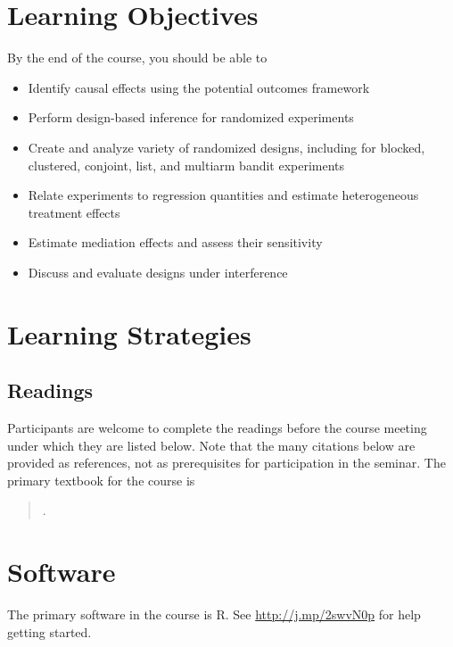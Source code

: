 \documentclass[11pt]{article}
\newcommand{\bibverse}[1]{\begin{verse} \bibentry{#1}. \end{verse}}
\begin{document}
\section*{Learning Objectives}

By the end of the course, you should be able to

\begin{itemize}
\item Identify causal effects using the potential outcomes framework
\item Perform design-based inference for randomized experiments
\item Create and analyze variety of randomized designs, including for blocked, clustered, conjoint, list, and multiarm bandit experiments
\item Relate experiments to regression quantities and estimate heterogeneous treatment effects
\item Estimate mediation effects and assess their sensitivity
\item Discuss and evaluate designs under interference
\end{itemize}

\section*{Learning Strategies}

\subsection*{Readings}

Participants are welcome to complete the readings before the course meeting under which they are listed below. Note that the many citations below are provided as references, not as prerequisites for participation in the seminar. The primary textbook for the course is

\nobibliography*

\bibverse{gergre12}

\section*{Software}

The primary software in the course is R. See \href{http://www.ryantmoore.org/files/class/introPolResearch/intro_R_short.pdf}{http://j.mp/2swvN0p}
for help getting started.
\end{document}
